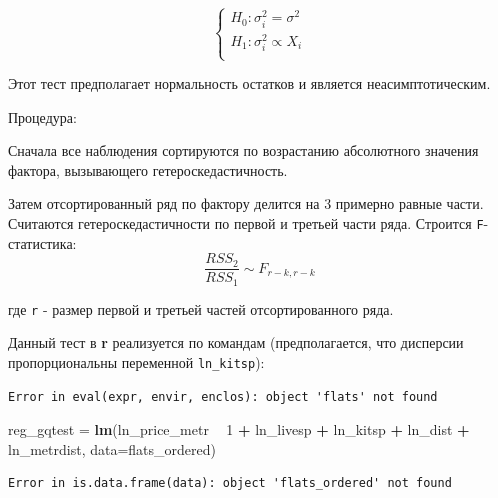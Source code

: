 \documentclass[]{book}
\newenvironment{Shaded}{\begin{snugshade}}{\end{snugshade}}
\newcommand{\DataTypeTok}[1]{\textcolor[rgb]{0.13,0.29,0.53}{#1}}
\newcommand{\DecValTok}[1]{\textcolor[rgb]{0.00,0.00,0.81}{#1}}
\newcommand{\KeywordTok}[1]{\textcolor[rgb]{0.13,0.29,0.53}{\textbf{#1}}}
\newcommand{\NormalTok}[1]{#1}
\newcommand{\OperatorTok}[1]{\textcolor[rgb]{0.81,0.36,0.00}{\textbf{#1}}}
\newcommand{\StringTok}[1]{\textcolor[rgb]{0.31,0.60,0.02}{#1}}
\begin{document}
\[
\begin{cases}
H_0: \sigma^2_i = \sigma^2 \\
H_1: \sigma^2_i \propto X_i \\
\end{cases}
\]

Этот тест предполагает нормальность остатков и является неасимптотическим.

Процедура:

Сначала все наблюдения сортируются по возрастанию абсолютного значения фактора, вызывающего гетероскедастичность.

Затем отсортированный ряд по фактору делится на 3 примерно равные части. Считаются гетероскедастичности по первой и третьей части ряда.
Строится \texttt{F}-статистика:
\[
\frac{RSS_2}{RSS_1} \sim F_{r - k, r-k}
\]

где \texttt{r} - размер первой и третьей частей отсортированного ряда.

Данный тест в \textbf{r} реализуется по командам (предполагается, что дисперсии пропорциональны переменной \texttt{ln\_kitsp}):

\begin{Shaded}
\end{Shaded}

\begin{verbatim}
Error in eval(expr, envir, enclos): object 'flats' not found
\end{verbatim}

\begin{Shaded}
\begin{Highlighting}[]
\NormalTok{reg_gqtest =}\StringTok{ }\KeywordTok{lm}\NormalTok{(ln_price_metr }\OperatorTok{~}\StringTok{ }\DecValTok{1} \OperatorTok{+}\StringTok{ }\NormalTok{ln_livesp }\OperatorTok{+}\StringTok{ }\NormalTok{ln_kitsp }\OperatorTok{+}\StringTok{ }\NormalTok{ln_dist }\OperatorTok{+}\StringTok{ }\NormalTok{ln_metrdist, }\DataTypeTok{data=}\NormalTok{flats_ordered)}
\end{Highlighting}
\end{Shaded}

\begin{verbatim}
Error in is.data.frame(data): object 'flats_ordered' not found
\end{verbatim}
\end{document}
